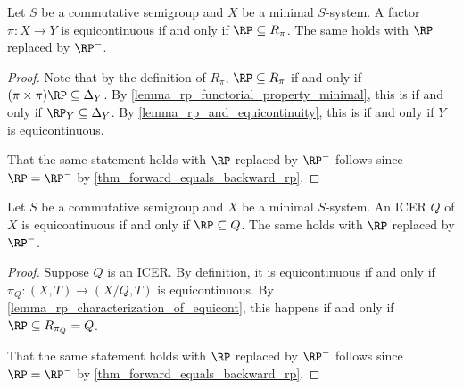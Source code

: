 \begin{lemma}
    \label{lemma_rp_characterization_of_equicont}
    \leanok{}
    Let $S$ be a commutative semigroup and $X$ be a minimal $S$-system.  A factor $\pi: X \to Y$ is equicontinuous if and only if $\RP \subseteq R_\pi$.  The same holds with $\RP$ replaced by $\RP^-$.
\end{lemma}

\begin{proof}
    Note that by the definition of $R_\pi$, $\RP \subseteq R_\pi$ if and only if $(\pi \times \pi) \RP \subseteq \Delta_Y$.  By \cref{lemma_rp_functorial_property_minimal}, this is if and only if $\RP_Y \subseteq \Delta_Y$.  By \cref{lemma_rp_and_equicontinuity}, this is if and only if $Y$ is equicontinuous.

    That the same statement holds with $\RP$ replaced by $\RP^-$ follows since $\RP = \RP^-$ by \cref{thm_forward_equals_backward_rp}.
\end{proof}

\begin{lemma}
    \label{lemma_rp_characterization_of_equicont_icer}
    \leanok{}
    Let $S$ be a commutative semigroup and $X$ be a minimal $S$-system.  An ICER $Q$ of $X$ is equicontinuous if and only if $\RP \subseteq Q$. The same holds with $\RP$ replaced by $\RP^-$.
\end{lemma}

\begin{proof}
    Suppose $Q$ is an ICER.  By definition, it is equicontinuous if and only if $\pi_Q: (X,T) \to (X/Q,T)$ is equicontinuous.  By \cref{lemma_rp_characterization_of_equicont}, this happens if and only if $\RP \subseteq R_{\pi_Q} = Q$.

    That the same statement holds with $\RP$ replaced by $\RP^-$ follows since $\RP = \RP^-$ by \cref{thm_forward_equals_backward_rp}.
\end{proof}

